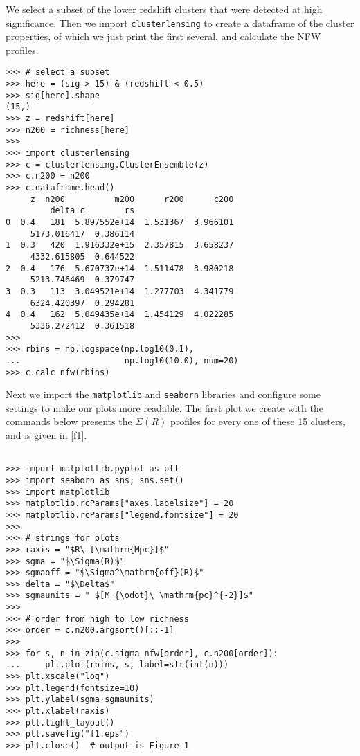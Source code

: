 \documentclass[twocolumn]{aastex6}
\newcommand{\code}{\lstinline[style=codeintext]}
\begin{document}
We select a subset of the lower redshift clusters that were detected at high significance. Then we import \code{clusterlensing} to create a dataframe of the cluster properties, of which we just print the first several, and calculate the NFW profiles.

\begin{verbatim}
>>> # select a subset
>>> here = (sig > 15) & (redshift < 0.5)
>>> sig[here].shape
(15,)
>>> z = redshift[here]
>>> n200 = richness[here]
>>> 
>>> import clusterlensing
>>> c = clusterlensing.ClusterEnsemble(z)
>>> c.n200 = n200
>>> c.dataframe.head()
     z  n200          m200      r200      c200
         delta_c        rs
0  0.4   181  5.897552e+14  1.531367  3.966101
     5173.016417  0.386114
1  0.3   420  1.916332e+15  2.357815  3.658237
     4332.615805  0.644522
2  0.4   176  5.670737e+14  1.511478  3.980218
     5213.746469  0.379747
3  0.3   113  3.049521e+14  1.277703  4.341779
     6324.420397  0.294281
4  0.4   162  5.049435e+14  1.454129  4.022285
     5336.272412  0.361518
>>>
>>> rbins = np.logspace(np.log10(0.1),
...                     np.log10(10.0), num=20)
>>> c.calc_nfw(rbins)
\end{verbatim}
\label{3dmf2df}

Next we import the \code{matplotlib} and \code{seaborn} libraries and configure some settings to make our plots more readable. The first plot we create with the commands below presents the $\Sigma(R)$ profiles for every one of these 15 clusters, and is given in \cref{f1}.

\begin{verbatim}

>>> import matplotlib.pyplot as plt
>>> import seaborn as sns; sns.set()
>>> import matplotlib
>>> matplotlib.rcParams["axes.labelsize"] = 20
>>> matplotlib.rcParams["legend.fontsize"] = 20
>>> 
>>> # strings for plots
>>> raxis = "$R\ [\mathrm{Mpc}]$"
>>> sgma = "$\Sigma(R)$"
>>> sgmaoff = "$\Sigma^\mathrm{off}(R)$"
>>> delta = "$\Delta$"
>>> sgmaunits = " $[M_{\odot}\ \mathrm{pc}^{-2}]$"
>>> 
>>> # order from high to low richness
>>> order = c.n200.argsort()[::-1]
>>> 
>>> for s, n in zip(c.sigma_nfw[order], c.n200[order]):
...     plt.plot(rbins, s, label=str(int(n)))
>>> plt.xscale("log")
>>> plt.legend(fontsize=10)
>>> plt.ylabel(sgma+sgmaunits)
>>> plt.xlabel(raxis)
>>> plt.tight_layout()
>>> plt.savefig("f1.eps")
>>> plt.close()  # output is Figure 1

\end{verbatim}
\end{document}
